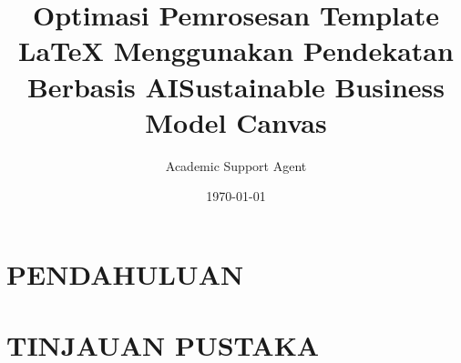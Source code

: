 \documentclass{article}
\title{Optimasi Pemrosesan Template LaTeX Menggunakan Pendekatan Berbasis AI}
\author{Academic Support Agent}
\date{\today}
\begin{document}
\maketitle

\begin{abstract}

\end{abstract}

\chapter{PENDAHULUAN}


\chapter{TINJAUAN PUSTAKA}






\usepackage[landscape,margin=0in]{geometry}
\usepackage[utf8]{inputenc}
\usepackage{hyperref}
\renewcommand{\rmdefault}{phv}
\renewcommand{\sfdefault}{phv} 

\usepackage{tikz}

\title{\vspace{-2em}Sustainable Business Model Canvas}
\date{}
\author{}
\end{document}
